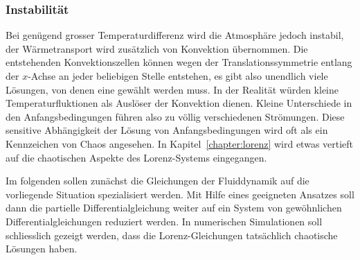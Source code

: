 \subsubsection{Instabilität}
Bei genügend grosser Temperaturdifferenz wird die Atmosphäre jedoch
instabil, der Wärmetransport wird zusätzlich von Konvektion übernommen.
Die entstehenden Konvektionszellen können wegen der Translationssymmetrie
entlang der $x$-Achse an jeder beliebigen Stelle entstehen, es gibt also
unendlich viele Lösungen, von denen eine gewählt werden muss.
In der Realität würden kleine Temperaturfluktionen als Auslöser der 
Konvektion dienen.
Kleine Unterschiede in den Anfangsbedingungen führen also zu völlig
verschiedenen Strömungen.
Diese sensitive Abhängigkeit der Lösung von Anfangsbedingungen wird
oft als ein Kennzeichen von Chaos angesehen.
In Kapitel~\ref{chapter:lorenz} wird etwas vertieft auf die chaotischen
Aspekte des Lorenz-Systems eingegangen.

Im folgenden sollen zunächst die Gleichungen der Fluiddynamik auf die
vorliegende Situation spezialisiert werden.
Mit Hilfe eines geeigneten Ansatzes soll dann die partielle
Differentialgleichung weiter auf ein System von gewöhnlichen 
Differentialgleichungen reduziert werden.
In numerischen Simulationen soll schliesslich gezeigt werden, dass die 
Lorenz-Gleichungen tatsächlich chaotische Lösungen haben.

